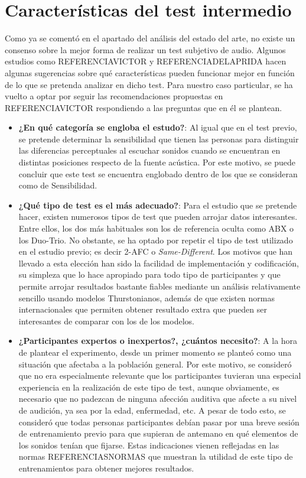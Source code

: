 \documentclass[11pt,a4paper,twoside]{book}
\begin{document}
        \section{Características del test intermedio}
            Como ya se comentó en el apartado del análisis del estado del arte, no existe un consenso sobre la mejor forma de realizar un test subjetivo de audio. Algunos estudios como REFERENCIAVICTOR y REFERENCIADELAPRIDA hacen algunas sugerencias sobre qué características pueden funcionar mejor en función de lo que se pretenda analizar en dicho test. Para nuestro caso particular, se ha vuelto a optar por seguir las recomendaciones propuestas en REFERENCIAVICTOR respondiendo a las preguntas que en él se plantean.
            
            \begin{itemize}
                
                \item \textbf{¿En qué categoría se engloba el estudo?}: Al igual que en el test previo, se pretende determinar la sensibilidad que tienen las personas para distinguir las diferencias perceptuales al escuchar sonidos cuando se encuentran en distintas posiciones respecto de la fuente acústica. Por este motivo, se puede concluir que este test se encuentra englobado dentro de los que se consideran como de Sensibilidad.
                \item \textbf{¿Qué tipo de test es el más adecuado?}: Para el estudio que se pretende hacer, existen numerosos tipos de test que pueden arrojar datos interesantes. Entre ellos, los dos más habituales son los de referencia oculta como ABX o los Duo-Trio. No obstante, se ha optado por repetir el tipo de test utilizado en el estudio previo; es decir 2-AFC o \textit{Same-Different}. Los motivos que han llevado a esta elección han sido la facilidad de implementación y codificación, su simpleza que lo hace apropiado para todo tipo de participantes y que permite arrojar resultados bastante fiables mediante un análisis relativamente sencillo usando modelos Thurstonianos, además de que existen normas internacionales que permiten obtener resultado extra que pueden ser interesantes de comparar con los de los modelos.
                \item \textbf{¿Participantes expertos o inexpertos?, ¿cuántos necesito?}: A la hora de plantear el experimento, desde un primer momento se planteó como una situación que afectaba a la población general. Por este motivo, se consideró que no era especialmente relevante que los participantes tuvieran una especial experiencia en la realización de este tipo de test, aunque obviamente, es necesario que no padezcan de ninguna afección auditiva que afecte a su nivel de audición, ya sea por la edad, enfermedad, etc. A pesar de todo esto, se consideró que todas personas participantes debían pasar por una breve sesión de entrenamiento previo para que supieran de antemano en qué elementos de los sonidos tenían que fijarse. Estas indicaciones vienen reflejadas en las normas REFERENCIASNORMAS que muestran la utilidad de este tipo de entrenamientos para obtener mejores resultados.
                

\end{itemize}
\end{document}
